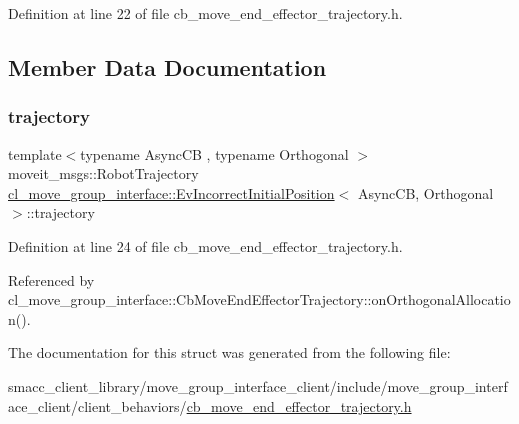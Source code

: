 Definition at line 22 of file cb\+\_\+move\+\_\+end\+\_\+effector\+\_\+trajectory.\+h.



\subsection{Member Data Documentation}
\mbox{\label{structcl__move__group__interface_1_1EvIncorrectInitialPosition_a5e8e161fe0d22db3bd7b4d71fae3f23d}} 
\subsubsection{\texorpdfstring{trajectory}{trajectory}}
{\footnotesize\ttfamily template$<$typename Async\+CB , typename Orthogonal $>$ \\
moveit\+\_\+msgs\+::\+Robot\+Trajectory \hyperlink{structcl__move__group__interface_1_1EvIncorrectInitialPosition}{cl\+\_\+move\+\_\+group\+\_\+interface\+::\+Ev\+Incorrect\+Initial\+Position}$<$ Async\+CB, Orthogonal $>$\+::trajectory}



Definition at line 24 of file cb\+\_\+move\+\_\+end\+\_\+effector\+\_\+trajectory.\+h.



Referenced by cl\+\_\+move\+\_\+group\+\_\+interface\+::\+Cb\+Move\+End\+Effector\+Trajectory\+::on\+Orthogonal\+Allocation().



The documentation for this struct was generated from the following file\+:\begin{DoxyCompactItemize}
\item 
smacc\+\_\+client\+\_\+library/move\+\_\+group\+\_\+interface\+\_\+client/include/move\+\_\+group\+\_\+interface\+\_\+client/client\+\_\+behaviors/\hyperlink{cb__move__end__effector__trajectory_8h}{cb\+\_\+move\+\_\+end\+\_\+effector\+\_\+trajectory.\+h}\end{DoxyCompactItemize}
